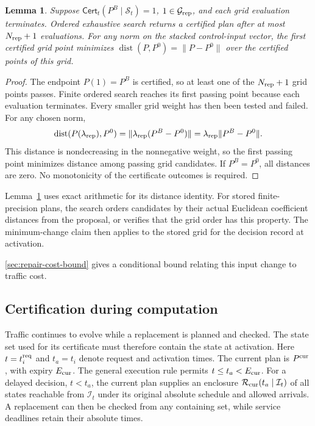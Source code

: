 \documentclass[preprint,12pt]{elsarticle}
\theoremstyle{definition}
\theoremstyle{plain}
\newtheorem{lemma}{Lemma}
\theoremstyle{definition}
\theoremstyle{plain}
\newcommand{\appref}[1]{\ref{#1}}
\begin{document}
\begin{lemma}
\label{thm:repair-grid}
Suppose $\mathsf{Cert}_t(P^B\mid\mathcal S_t)=1$, $1\in\mathcal G_{\rm rep}$, and each
grid evaluation terminates. Ordered exhaustive search returns a certified
plan after at most $N_{\rm rep}+1$ evaluations. For any norm on the stacked
control-input vector, the first certified grid point minimizes
$\operatorname{dist}(P,P^0)=\|P-P^0\|$ over the certified points of this grid.
\end{lemma}

\begin{proof}
The endpoint $P(1)=P^B$ is certified, so at least one of the
$N_{\rm rep}+1$ grid points passes. Finite ordered search reaches its
first passing point because each evaluation terminates. Every smaller
grid weight has then been tested and failed. For any chosen norm,
\[
 \operatorname{dist}(P(\lambda_{\rm rep}),P^0)
 =\|\lambda_{\rm rep}(P^B-P^0)\|
 =\lambda_{\rm rep}\|P^B-P^0\|.
\]
This distance is nondecreasing in the nonnegative weight, so the first
passing point minimizes distance among passing grid candidates. If
$P^B=P^0$, all distances are zero. No monotonicity of the certificate
outcomes is required.
\end{proof}

Lemma~\ref{thm:repair-grid} uses exact arithmetic for its distance
identity. For stored finite-precision plans, the search orders candidates
by their actual Euclidean coefficient distances from the proposal, or
verifies that the grid order has this property. The minimum-change claim
then applies to the stored grid for the decision record at activation.

\appref{sec:repair-cost-bound} gives a conditional bound relating this
input change to traffic cost.

\subsection{Certification during computation}
\label{sec:planned-handover}

Traffic continues to evolve while a replacement is planned and checked.
The state set used for its certificate must therefore contain the state
at activation. Here $t=t_i^{\rm req}$ and $t_a=t_i$ denote request and
activation times. The current plan is $P^{\rm cur}$, with expiry
$E_{\rm cur}$. The general execution rule permits $t\le t_a<E_{\rm cur}$.
For a delayed decision, $t<t_a$, the current plan supplies an enclosure
$\mathcal R_{\rm cur}(t_a\mid\mathcal I_t)$ of all states reachable from
$\mathcal I_t$ under its original absolute schedule and allowed arrivals.
A replacement can then be checked from any containing set, while service
deadlines retain their absolute times.
\end{document}
